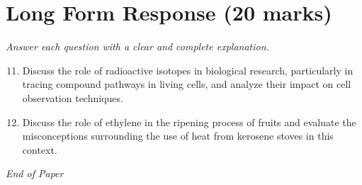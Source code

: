 \documentclass[12pt]{article}
\begin{document}
\section*{Long Form Response (20 marks)}
\textit{Answer each question with a clear and complete explanation.}
\begin{enumerate}[label=\arabic*.]
\setcounter{enumi}{10}
\item Discuss the role of radioactive isotopes in biological research, particularly in tracing compound pathways in living cells, and analyze their impact on cell observation techniques.
\item Discuss the role of ethylene in the ripening process of fruits and evaluate the misconceptions surrounding the use of heat from kerosene stoves in this context.
\end{enumerate}

\vfill
\noindent\textit{End of Paper}
\end{document}
